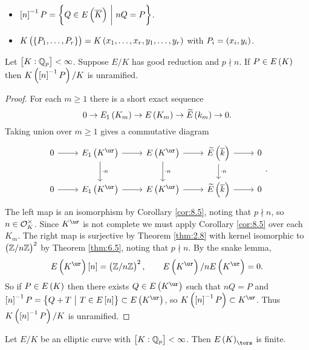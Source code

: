 \begin{notation*}
\hfill
\begin{itemize}
\item $ \sbr{n}^{-1}P = \cbr{Q \in E\br{\overline{K}} \st nQ = P} $.
\item $ K\br{\cbr{P_1, \dots, P_r}} = K\br{x_1, \dots, x_r, y_1, \dots, y_r} $ with $ P_i = \br{x_i, y_i} $.
\end{itemize}
\end{notation*}

\begin{theorem}
\label{thm:9.9}
Let $ \sbr{K : \QQ_p} < \infty $. Suppose $ E / K $ has good reduction and $ p \nmid n $. If $ P \in E\br{K} $ then $ K\br{\sbr{n}^{-1}P} / K $ is unramified.
\end{theorem}

\begin{proof}
For each $ m \ge 1 $ there is a short exact sequence
$$ 0 \to E_1\br{K_m} \to E\br{K_m} \to \widetilde{E}\br{k_m} \to 0. $$
Taking union over $ m \ge 1 $ gives a commutative diagram
$$
\begin{tikzcd}
0 \arrow{r} & E_1\br{K^{\ur}} \arrow{r} \arrow{d}{\cdot n} & E\br{K^{\ur}} \arrow{r} \arrow{d}{\cdot n} & \widetilde{E}\br{\overline{k}} \arrow{r} \arrow{d}{\cdot n} & 0 \\
0 \arrow{r} & E_1\br{K^{\ur}} \arrow{r} & E\br{K^{\ur}} \arrow{r} & \widetilde{E}\br{\overline{k}} \arrow{r} & 0
\end{tikzcd}.
$$
The left map is an isomorphism by Corollary \ref{cor:8.5}, noting that $ p \nmid n $, so $ n \in \mathcal{O}_K^\times $. Since $ K^{\ur} $ is not complete we must apply Corollary \ref{cor:8.5} over each $ K_m $. The right map is surjective by Theorem \ref{thm:2.8} with kernel isomorphic to $ \br{\ZZ / n\ZZ}^2 $ by Theorem \ref{thm:6.5}, noting that $ p \nmid n $. By the snake lemma,
$$ E\br{K^{\ur}}\sbr{n} = \br{\ZZ / n\ZZ}^2, \qquad E\br{K^{\ur}} / nE\br{K^{\ur}} = 0. $$
So if $ P \in E\br{K} $ then there exists $ Q \in E\br{K^{\ur}} $ such that $ nQ = P $ and $ \sbr{n}^{-1}P = \cbr{Q + T \st T \in E\sbr{n}} \subset E\br{K^{\ur}} $, so $ K\br{\sbr{n}^{-1}P} \subset K^{\ur} $. Thus $ K\br{\sbr{n}^{-1}P} / K $ is unramified.
\end{proof}


\begin{corollary}
\label{cor:9.10}
Let $ E / K $ be an elliptic curve with $ \sbr{K : \QQ_p} < \infty $. Then $ E\br{K}_{\tors} $ is finite.
\end{corollary}

